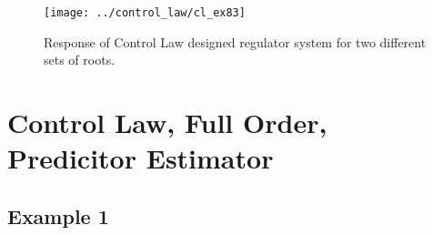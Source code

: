 \documentclass{article}
\begin{document}


\begin{figure}[h!]
\begin{center}
\texttt{[image: ../control\_law/cl\_ex83]}
\end{center}
\caption{Response of Control Law designed regulator system
for two different sets of roots.}
\label{fig:cl_ex83}
\end{figure}


\clearpage
\section{Control Law, Full Order, Predicitor Estimator}


%
%
%
%
%
%
%

\subsection{Example 1}

\end{document}
